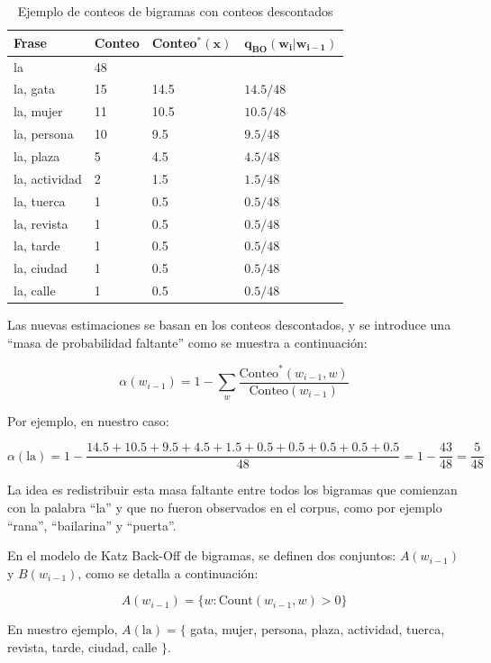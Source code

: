 \begin{table}[h]
    \centering
    \begin{tabular}{|l|l|l|l|}\hline
        \textbf{Frase} & \textbf{Conteo} & \textbf{Conteo}$\mathbf{^*(x)}$ & $\mathbf{q_{\text{BO}}(w_i | w_{i-1})}$ \\
        \hline
        la & 48 & & \\
        la, gata & 15 & 14.5 & $14.5/48$ \\
        la, mujer & 11 & 10.5 & $10.5/48$ \\
        la, persona & 10 & 9.5 & $9.5/48$ \\
        la, plaza & 5 & 4.5 & $4.5/48$ \\
        la, actividad & 2 & 1.5 & $1.5/48$ \\
        la, tuerca & 1 & 0.5 & $0.5/48$ \\
        la, revista & 1 & 0.5 & $0.5/48$ \\
        la, tarde & 1 & 0.5 & $0.5/48$ \\
        la, ciudad & 1 & 0.5 & $0.5/48$ \\
        la, calle & 1 & 0.5 & $0.5/48$ \\\hline
    \end{tabular}\caption{Ejemplo de conteos de bigramas con conteos descontados}\label{tab:plm_ej}
\end{table}

Las nuevas estimaciones se basan en los conteos descontados, y se introduce una ``masa de probabilidad faltante'' como se muestra a continuación:

\[
\alpha(w_{i-1}) = 1 - \sum_{w} \frac{\text{Conteo}^*(w_{i-1}, w)}{\text{Conteo}(w_{i-1})}
\]

Por ejemplo, en nuestro caso:

\[
\alpha(\text{la}) = 1 - \frac{14.5+10.5+9.5+4.5+1.5+0.5+0.5+0.5+0.5+0.5}{48} = 1-\frac{43}{48} = \frac{5}{48}
\]

La idea es redistribuir esta masa faltante entre todos los bigramas que comienzan con la palabra ``la'' y que no fueron observados en el corpus, como por ejemplo ``rana'', ``bailarina'' y ``puerta''.

En el modelo de Katz Back-Off de bigramas, se definen dos conjuntos: $A(w_{i-1})$ y $B(w_{i-1})$, como se detalla a continuación:

\[
A(w_{i-1}) = \{w : \text{Count}(w_{i-1}, w) > 0\}
\]

En nuestro ejemplo, $A(\text{la}) = \{$ gata, mujer, persona, plaza, actividad, tuerca, revista, tarde, ciudad, calle $\}$.

